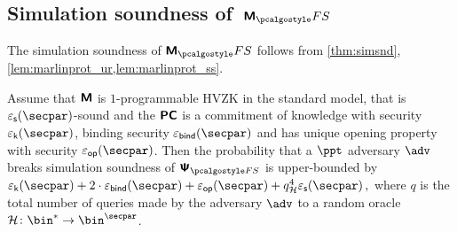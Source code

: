 \subsection{Simulation soundness of~$\marlinprotfs$}
	The simulation soundness of $\marlinprot_\fs$ follows from \cref{thm:simsnd}, \cref{lem:marlinprot_ur,lem:marlinprot_ss}.
\begin{corollary}
	\label{cor:simsnd-M}
	Assume that $\bm{\mathsf{M}}$ is $1$-programmable HVZK in the standard model, that
	is $\epss(\secpar)$-sound and the $\bm{\mathsf{PC}}$ is a commitment of knowledge with
	security $\epsk(\secpar)$, binding security $\epsbind(\secpar)$ and has unique
	opening property with security $\epsop(\secpar)$. Then the probability that a
	$\ppt$ adversary $\adv$ breaks simulation soundness of $\ps_{\fs}$ is
	upper-bounded by
	\( \epsk(\secpar) + 2\cdot\epsbind(\secpar) + \epsop(\secpar) + q_\ro^4
	\epss(\secpar)\,, \) where $q$ is the total number of queries made by the
	adversary $\adv$ to a random oracle $\ro\colon \bin^{*} \to \bin^{\secpar}$.
\end{corollary}


